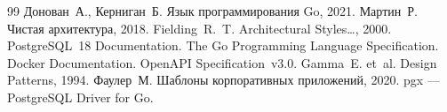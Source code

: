 \documentclass[a4paper,14pt]{extarticle}
\begin{document}
\begin{thebibliography}{99}
 Донован~А., Керниган~Б. Язык программирования Go, 2021.
 Мартин~Р. Чистая архитектура, 2018.
 Fielding~R.~T. Architectural Styles\ldots, 2000.
 PostgreSQL~18 Documentation.
 The Go Programming Language Specification.
 Docker Documentation.
 OpenAPI Specification~v3.0.
 Gamma~E. et~al. Design Patterns, 1994.
 Фаулер~М. Шаблоны корпоративных приложений, 2020.
 pgx --- PostgreSQL Driver for Go.
\end{thebibliography}
\end{document}
